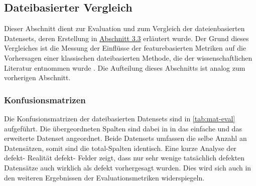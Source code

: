 \subsection{Dateibasierter Vergleich}
\label{classic-eval}

Dieser Abschnitt dient zur Evaluation und zum Vergleich der dateienbasierten Datensets, deren Erstellung in \hyperref[new-datasets]{Abschnitt 3.3} erläutert wurde. Der Grund dieses Vergleiches ist die Messung der Einflüsse der featurebasierten Metriken auf die Vorhersagen einer klassischen dateibasierten Methode, die der wissenschaftlichen Literatur entnommen wurde \cite{Moser2008}. Die Aufteilung dieses Abschnitts ist analog zum vorherigen Abschnitt.

\subsubsection*{Konfusionsmatrizen}

Die Konfusionsmatrizen der dateibasierten Datensets sind in \autoref{tab:mat-eval} aufgeführt. Die übergeordneten Spalten sind dabei in in das \glqq einfache\grqq{} und das erweiterte Datenset angeordnet. Beide Datensets umfassen die selbe Anzahl an Datensätzen, somit sind die \glqq total\grqq -Spalten identisch.
Eine kurze Analyse der \glqq defekt\grqq - \glqq Realität defekt\grqq - Felder zeigt, dass nur sehr wenige tatsächlich defekten Datensätze auch wirklich als defekt vorhergesagt wurden. Dies wird sich auch in den weiteren Ergebnissen der Evaluationsmetriken widerspiegeln.

